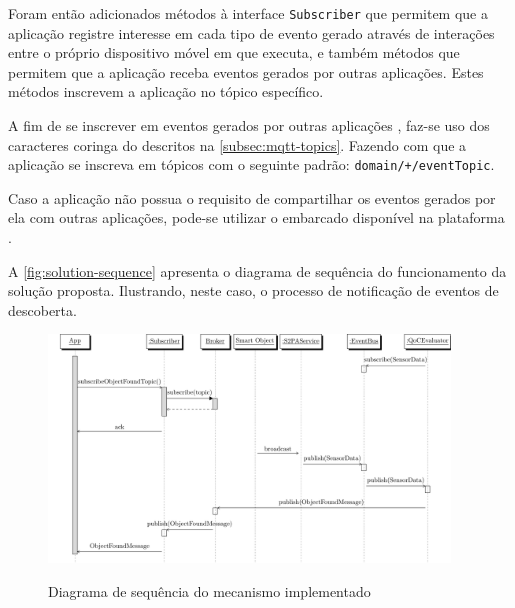 Foram então adicionados métodos à interface \texttt{Subscriber} que permitem que a aplicação registre interesse em cada tipo de evento gerado através de interações entre \smartobjs o próprio dispositivo móvel em que executa, e também métodos que permitem que a aplicação receba eventos gerados por outras aplicações. Estes métodos inscrevem a aplicação no tópico \mqtt específico.

A fim de se inscrever em eventos gerados por outras aplicações \mhubcddl, faz-se uso dos caracteres coringa do \mqtt descritos na \autoref{subsec:mqtt-topics}. Fazendo com que a aplicação se inscreva em tópicos com o seguinte padrão: \texttt{domain/+/eventTopic}.

Caso a aplicação não possua o requisito de compartilhar os eventos gerados por ela com outras aplicações, pode-se utilizar o \ubroker embarcado disponível na plataforma \mhubcddl.

A \autoref{fig:solution-sequence} apresenta o diagrama de sequência do funcionamento da solução proposta. Ilustrando, neste caso, o processo de notificação de eventos de descoberta.

\begin{figure}[htb]
	\centering
	\caption{Diagrama de sequência do mecanismo implementado}
	\includegraphics[width=0.95\textwidth]{img/solution-sequence.pdf}
	\label{fig:solution-sequence}
\end{figure}

